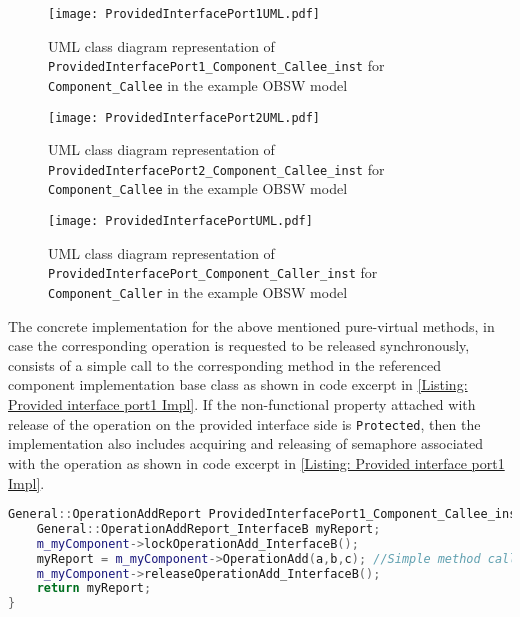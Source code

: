 \begin{figure}[h]
	\centering
	\texttt{[image: ProvidedInterfacePort1UML.pdf]}
	\caption{UML class diagram representation of \texttt{Provided\allowbreak Interface\allowbreak Port1\allowbreak\_Component\allowbreak\_Callee\allowbreak\_inst} for \texttt{Component\allowbreak\_Callee} in the example OBSW model}
	\label{fig: Provided interface port1 UML}
\end{figure}

\begin{figure}[h]
	\centering
	\texttt{[image: ProvidedInterfacePort2UML.pdf]}
	\caption{UML class diagram representation of \texttt{Provided\allowbreak Interface\allowbreak Port2\allowbreak\_Component\allowbreak\_Callee\allowbreak\_inst} for \texttt{Component\allowbreak\_Callee} in the example OBSW model}
	\label{fig: Provided interface port2 UML}
\end{figure}

\begin{figure}[h]
	\centering
	\texttt{[image: ProvidedInterfacePortUML.pdf]}
	\caption{UML class diagram representation of \texttt{Provided\allowbreak Interface\allowbreak Port\allowbreak\_Component\allowbreak\_Caller\allowbreak\_inst} for \texttt{Component\allowbreak\_Caller} in the example OBSW model}
	\label{fig: Provided interface port UML}
\end{figure}   

The concrete implementation for the above mentioned pure-virtual methods, in case the corresponding operation is requested to be released synchronously, consists of a simple call to the corresponding method in the referenced component implementation base class as shown in code excerpt in \cref{Listing: Provided interface port1 Impl}. If the non-functional property attached with release of the operation on the provided interface side is \texttt{Protected}, then the implementation also includes acquiring and releasing of semaphore associated with the operation as shown in code excerpt in \cref{Listing: Provided interface port1 Impl}. 

\begin{Listing}
\begin{lstlisting}[language=C++]
General::OperationAddReport ProvidedInterfacePort1_Component_Callee_inst::OperationAdd (const IntegerType& a,const IntegerType& b,IntegerType& c) {
	General::OperationAddReport_InterfaceB myReport;
	m_myComponent->lockOperationAdd_InterfaceB();
	myReport = m_myComponent->OperationAdd(a,b,c); //Simple method call
	m_myComponent->releaseOperationAdd_InterfaceB();
	return myReport;
}
\end{lstlisting}
\caption{Code excerpt from the generated code for operation \texttt{OperationAdd} access in \texttt{Provided\allowbreak Interface\allowbreak Port1\_\allowbreak Component\_\allowbreak Callee\_\allowbreak inst} which is called synchronously and has \texttt{Protected} as a non-functional property attached to it}
\label{Listing: Provided interface port1 Impl}
\end{Listing}

